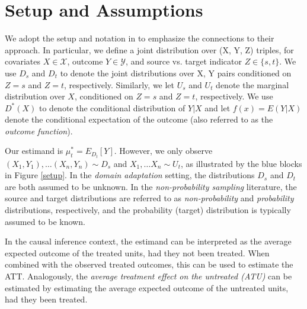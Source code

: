 \documentclass{article} %
\begin{document}


\section{Setup and Assumptions}
We adopt the setup and notation in \cite{kim2022universal} to emphasize the connections to their approach. In particular, we define a joint distribution over (X, Y, Z) triples, for covariates $X \in \mathcal{X}$, outcome $Y \in \mathcal{Y}$, and source vs. target indicator $Z \in \{s,t\}$. We use $D_s$ and $D_t$ to denote the joint distributions over X, Y pairs conditioned on $Z=s$ and $Z=t$, respectively. Similarly, we let $U_s$ and $U_t$ denote the marginal distribution over $X$, conditioned on $Z=s$ and $Z=t$, respectively. We use $D^*(X)$ to denote the conditional distribution of $Y|X$ and let $f(x) = E(Y|X)$ denote the conditional expectation of the outcome (also referred to as the \emph{outcome function}).

Our estimand is $\mu_t^* = E_{D_t}[Y]$. However, we only observe $(X_1,Y_1), \dots (X_n, Y_n) \sim D_s$ and $X_1, \dots X_n \sim U_t$, as illustrated by the blue blocks in Figure \ref{setup}. In the \emph{domain adaptation} setting, the distributions $D_s$ and $D_t$ are both assumed to be unknown. In the \emph{non-probability sampling} literature, the 
source and target distributions are referred to as \emph{non-probability} and \emph{probability} distributions, respectively, and the probability (target) distribution is typically assumed to be known. 

In the causal inference context, the estimand can be interpreted as the average expected outcome of the treated units, had they not been treated. When combined with the observed treated outcomes, this can be used to estimate the ATT. Analogously, the \emph{average treatment effect on the untreated (ATU)} can be estimated by estimating the average expected outcome of the untreated units, had they been treated.
\end{document}
